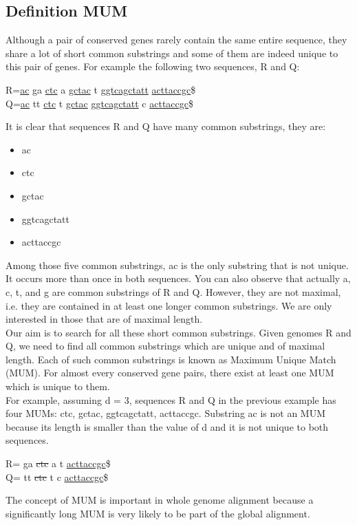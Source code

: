 \documentclass[twocolumn,twoside]{Jornadas}
\begin{document}
\subsection{Definition MUM}
Although a pair of conserved genes rarely contain the same entire sequence, they share a lot of short common substrings and some of them are indeed unique to this pair of genes. For example the following two sequences, R and Q:\\
\begin{center}
    R=\underline{ac} ga \underline{ctc} a \underline{gctac} t \underline{ggtcagctatt} \underline{acttaccgc}\$\\
      Q=\underline{ac} tt \underline{ctc} t \underline{gctac} \underline{ggtcagctatt} c \underline{acttaccgc}\$\\
    \end{center}
    It is clear that sequences R and Q have many common substrings, they are:
    \begin{itemize}
      \item ac
      \item ctc
      \item gctac
      \item ggtcagctatt
      \item acttaccgc
    \end{itemize}
Among those five common substrings, ac is the only substring that is not unique. It occurs more than once in both sequences. You can also observe that actually a, c, t, and g are common substrings of R and Q. However, they are not maximal, i.e. they are contained in at least one longer common substrings. We are only interested in those that are of maximal length.\\
Our aim is to search for all these short common substrings. Given genomes R and Q, we need to find all common substrings which are unique and of maximal length. Each of such common substrings is known as Maximum Unique Match (MUM). For almost every conserved gene pairs, there exist at least one MUM which is unique to them.\\
For example, assuming d = 3, sequences R and Q in the previous example has four MUMs: ctc, gctac, ggtcagctatt, acttaccgc. Substring ac is not an MUM because its length is smaller than the value of d and it is not unique to both sequences.
\begin{center}
    R= ga \sout{ctc} a  t  \uline{acttaccgc}\$\\
      Q= tt \sout{ctc} t   c \uline{acttaccgc}\$\\
    \end{center}
The concept of MUM is important in whole genome alignment because a significantly long MUM is very likely to be part of the global alignment.
\end{document}
